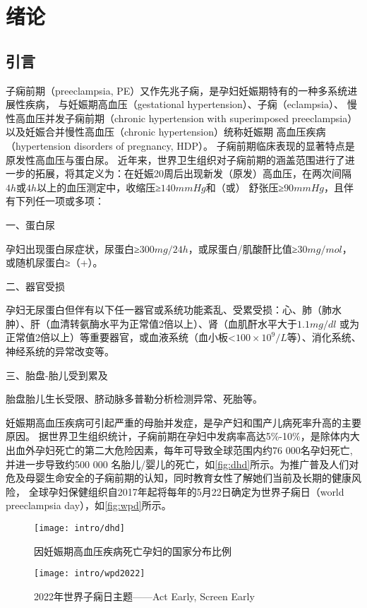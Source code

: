 \chapter{绪论}

\section{引言}
子痫前期（preeclampsia, PE）又作先兆子痫，是孕妇妊娠期特有的一种多系统进展性疾病， 与妊娠期高血压（gestational hypertension）、子痫（eclampsia）、
慢性高血压并发子痫前期（chronic hypertension with superimposed preeclampsia）以及妊娠合并慢性高血压（chronic hypertension）统称妊娠期
高血压疾病（hypertension disorders of pregnancy, HDP）\cite{OAG9,HDASOM,2000s1}。
子痫前期临床表现的显著特点是原发性高血压与蛋白尿。
近年来，世界卫生组织对子痫前期的涵盖范围进行了进一步的拓展，将其定义为：在妊娠20周后出现新发（原发）高血压，在两次间隔$4h$或$4h$以上的血压测定中，收缩压≥$140mmHg$和（或）
舒张压≥$90mmHg$，且伴有下列任一项或多项\cite{OAG9,FIGO}：

一、蛋白尿

孕妇出现蛋白尿症状，尿蛋白≥$300mg/24h$，或尿蛋白/肌酸酐比值≥$30mg/mol$，或随机尿蛋白≥（+）。

二、器官受损

孕妇无尿蛋白但伴有以下任一器官或系统功能紊乱、受累受损：心、肺（肺水肿）、肝（血清转氨酶水平为正常值2倍以上）、肾（血肌酐水平大于$1.1mg/dl$
或为正常值2倍以上）等重要器官，或血液系统（血小板<$100 \times 10^{9}/L$等）、消化系统、神经系统的异常改变等。

三、胎盘-胎儿受到累及

胎盘胎儿生长受限、脐动脉多普勒分析检测异常、死胎等。

妊娠期高血压疾病可引起严重的母胎并发症，是孕产妇和围产儿病死率升高的主要原因\cite{OAG9}。
据世界卫生组织统计，子痫前期在孕妇中发病率高达5\%-10\%，是除体内大出血外孕妇死亡的第二大危险因素\cite{LCT2006}，每年可导致全球范围内约76 000名孕妇死亡,并进一步导致约500 000
名胎儿/婴儿的死亡\cite{DAM2015,LCT2006}，如\autoref{fig:dhd}所示。为推广普及人们对危及母婴生命安全的子痫前期的认知，同时教育女性了解她们当前及长期的健康风险，
全球孕妇保健组织自2017年起将每年的5月22日确定为世界子痫日（world preeclampsia day），如\autoref{fig:wpd}所示。
\begin{figure}[htbp]
    \centering
    \texttt{[image: intro/dhd]}
    \caption[因妊娠期高血压疾病死亡孕妇的国家分布比例]{\label{fig:dhd}因妊娠期高血压疾病死亡孕妇的国家分布比例\cite{LCT2006}}
\end{figure}
\begin{figure}[htbp]
    \centering
    \texttt{[image: intro/wpd2022]}
    \caption{\label{fig:wpd}2022年世界子痫日主题——Act Early, Screen Early}
\end{figure}

